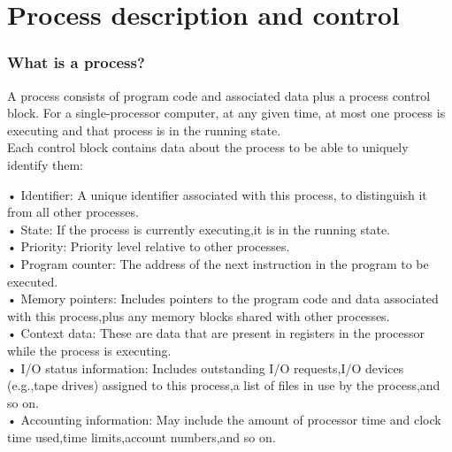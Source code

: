 
\chapter{Process description and control}

\subsection{What is a process?}

A process consists of program code and associated data plus a process control block. For a single-processor computer, at any given time, at
most one process is executing and that process is in the running state.\\

Each control block contains data about the process to be able to uniquely identify them:

• Identifier: A unique identifier associated with this process, to distinguish it
from all other processes.\\
• State: If the process is currently executing,it is in the running state.\\
• Priority: Priority level relative to other processes.\\
• Program counter: The address of the next instruction in the program to be
executed.\\
• Memory pointers: Includes pointers to the program code and data associated
with this process,plus any memory blocks shared with other processes.\\
• Context data: These are data that are present in registers in the processor
while the process is executing.\\
• I/O status information: Includes outstanding I/O requests,I/O devices (e.g.,tape
drives) assigned to this process,a list of files in use by the process,and so on.\\
• Accounting information: May include the amount of processor time and clock
time used,time limits,account numbers,and so on.\\


